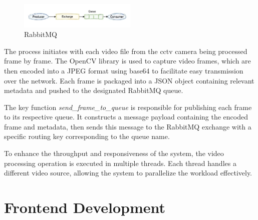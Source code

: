 \begin{figure}[h]
    \centering 
    \includegraphics[width=0.5\textwidth]{figs/rabbitmq.png} 
    \caption{RabbitMQ~\cite{rfc48}}
    \label{fig:rabbit-mq}
\end{figure}

The process initiates with each video file from the \ac{cctv} camera being processed frame by 
frame. The OpenCV library is used to capture video frames, which are then encoded into a JPEG format using base64 to 
facilitate easy transmission over the network. Each frame is packaged into a JSON object containing relevant metadata 
and pushed to the designated RabbitMQ queue.

The key function \textit{send\_frame\_to\_queue} is responsible for publishing each frame to its respective queue. 
It constructs a message payload containing the encoded frame and metadata, then sends
this message to the RabbitMQ exchange with a specific routing key corresponding to the queue name.

To enhance the throughput and responsiveness of the system, the video processing operation is executed in multiple 
threads. Each thread handles a different video source, allowing the system to parallelize the workload effectively.
\section{Frontend Development}
